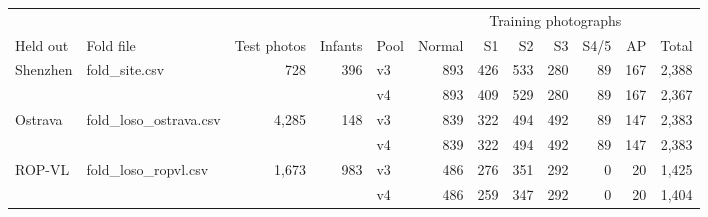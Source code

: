 \begin{tabular}{@{}llrrlrrrrrrr@{}}
\toprule
 & & & & & \multicolumn{7}{c}{Training photographs}\\
\cmidrule(l){6-12}
Held out & Fold file & Test photos & Infants & Pool & Normal & S1 & S2 & S3 & S4/5 & AP & Total\\
\midrule
Shenzhen & fold\_site.csv & 728 & 396 & v3 & 893 & 426 & 533 & 280 & 89 & 167 & 2{,}388 \\
 &  &  &  & v4 & 893 & 409 & 529 & 280 & 89 & 167 & 2{,}367 \\
Ostrava & fold\_loso\_ostrava.csv & 4{,}285 & 148 & v3 & 839 & 322 & 494 & 492 & 89 & 147 & 2{,}383 \\
 &  &  &  & v4 & 839 & 322 & 494 & 492 & 89 & 147 & 2{,}383 \\
ROP-VL & fold\_loso\_ropvl.csv & 1{,}673 & 983 & v3 & 486 & 276 & 351 & 292 & 0 & 20 & 1{,}425 \\
 &  &  &  & v4 & 486 & 259 & 347 & 292 & 0 & 20 & 1{,}404 \\
\bottomrule
\end{tabular}
